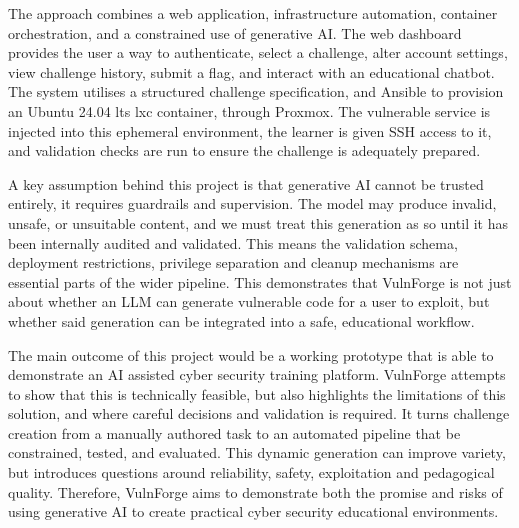 The approach combines a web application, infrastructure automation, container orchestration, and a constrained use of generative AI. The web dashboard provides the user a way to authenticate, select a challenge, alter account settings, view challenge history, submit a flag, and interact with an educational chatbot. The system utilises a structured challenge specification, and Ansible to provision an Ubuntu 24.04 \gls{lts} \gls{lxc} container, through Proxmox. The vulnerable service is injected into this ephemeral environment, the learner is given SSH access to it, and validation checks are run to ensure the challenge is adequately prepared.

A key assumption behind this project is that generative AI cannot be trusted entirely, it requires guardrails and supervision. The model may produce invalid, unsafe, or unsuitable content, and we must treat this generation as so until it has been internally audited and validated. This means the validation schema, deployment restrictions, privilege separation and cleanup mechanisms are essential parts of the wider pipeline. This demonstrates that VulnForge is not just about whether an LLM can generate vulnerable code for a user to exploit, but whether said generation can be integrated into a safe, educational workflow.

The main outcome of this project would be a working prototype that is able to demonstrate an AI assisted cyber security training platform. VulnForge attempts to show that this is technically feasible, but also highlights the limitations of this solution, and where careful decisions and validation is required. It turns challenge creation from a manually authored task to an automated pipeline that be constrained, tested, and evaluated. This dynamic generation can improve variety, but introduces questions around reliability, safety, exploitation and pedagogical quality. Therefore, VulnForge aims to demonstrate both the promise and risks of using generative AI to create practical cyber security educational environments.
